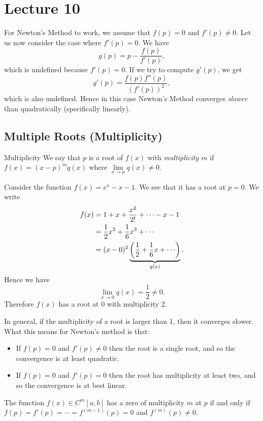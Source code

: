 \documentclass[class=article, crop=false]{standalone}
\begin{document}
  \section{Lecture 10}
  For Newton's Method to work, we assume that $f(p) = 0$ and $f'(p)\neq 0$. Let us now consider the case where $f'(p) = 0$. We have
  \[
    g(p) = p - \frac{f(p)}{f'(p)},
  \]
  which is undefined because $f'(p) = 0$. If we try to compute $g'(p)$, we get
  \[
    g'(p) = \frac{f(p)f''(p)}{(f'(p))^2},
  \]
  which is also undefined. Hence in this case Newton's Method converges \emph{slower} than quadratically (specifically linearly).
  \subsection{Multiple Roots (Multiplicity)}
  \begin{definition}{Multiplicity}
    We say that $p$ is a root of $f(x)$ with \emph{multiplicity $m$} if $f(x) = (x - p)^mq(x)$ where $\lim\limits_{x\to p} q(x)\neq 0$.
  \end{definition}
  \begin{example}{}
    Consider the function $f(x) = e^x - x - 1$. We see that it has a root at $p = 0$. We write
    \begin{align*}
      f(x) &= 1 + x + \frac{x^2}{2!} + \dotsb - x - 1 \\
           &= \frac{1}{2}x^2 + \frac{1}{6}x^3 + \dotsb \\
           &= (x - 0)^2\underbrace{\paren{\frac{1}{2} + \frac{1}{6}x + \dotsb}}_{q(x)}.
    \end{align*}
    Hence we have
    \[
      \lim_{x\to 0} q(x) = \frac{1}{2}\neq 0.
    \]
    Therefore $f(x)$ has a root at 0 with multiplicity 2.
  \end{example}
  In general, if the multiplicity of a root is larger than 1, then it converges slower. What this means for Newton's method is that:
  \begin{itemize}
     \item If $f(p) = 0$ and $f'(p)\neq 0$ then the root is a single root, and so the convergence is at least quadratic.
     \item If $f(p) = 0$ and $f'(p) = 0$ then the root has multiplicity at least two, and so the convergence is at best linear.
  \end{itemize}
  \begin{theorem}{}
    The function $f(x)\in C^m[a, b]$ has a zero of multiplicity $m$ at $p$ if and only if $f(p) = f'(p) = \dotsb = f^{(m - 1)}(p) = 0$ and $f^{(m)}(p)\neq 0$.
  \end{theorem}
\end{document}
